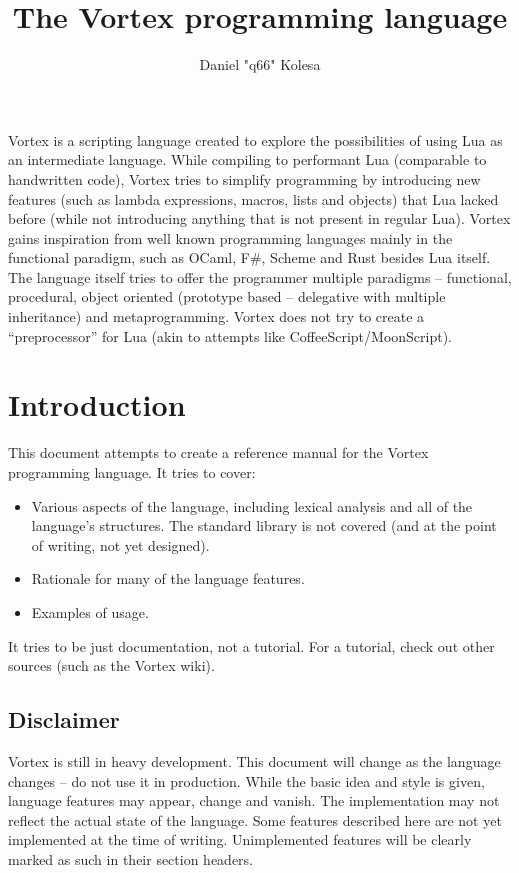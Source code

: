 \documentclass{article}
\title{The Vortex programming language}
\author{Daniel "q66" Kolesa}
\begin{document}
\maketitle
\thispagestyle{empty}

\abstract
Vortex is a scripting language created to explore the possibilities of using
Lua as an intermediate language. While compiling to performant Lua (comparable
to handwritten code), Vortex tries to simplify programming by introducing new
features (such as lambda expressions, macros, lists and objects) that Lua
lacked before (while not introducing anything that is not present in regular
Lua). Vortex gains inspiration from well known programming languages mainly
in the functional paradigm, such as OCaml, F\#, Scheme and Rust besides Lua
itself. The language itself tries to offer the programmer multiple paradigms
-- functional, procedural, object oriented (prototype based -- delegative with
    multiple inheritance) and metaprogramming. Vortex does not try to create a
\enquote{preprocessor} for Lua (akin to attempts like CoffeeScript/MoonScript).

\newpage
\thispagestyle{empty}
\tableofcontents
\pagebreak

\section{Introduction}
This document attempts to create a reference manual for the Vortex programming
language. It tries to cover:
\begin{itemize}
  \item Various aspects of the language, including lexical analysis and all of
      the language's structures. The standard library is not covered (and at
      the point of writing, not yet designed).
  \item Rationale for many of the language features.
  \item Examples of usage.
\end{itemize}
It tries to be just documentation, not a tutorial. For a tutorial, check out
other sources (such as the Vortex wiki).
\subsection{Disclaimer}
Vortex is still in heavy development. This document will change as the language
changes -- do not use it in production. While the basic idea and style is
given, language features may appear, change and vanish. The implementation
may not reflect the actual state of the language. Some features described here
are not yet implemented at the time of writing. Unimplemented features will be
clearly marked as such in their section headers.
\end{document}

